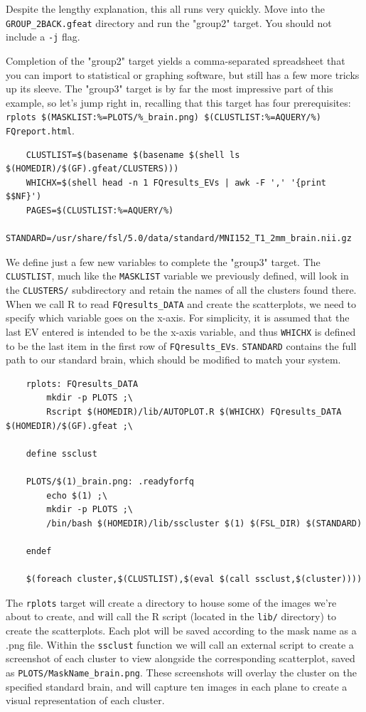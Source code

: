 Despite the lengthy explanation, this all runs very quickly. Move into the \texttt{GROUP_2BACK.gfeat} directory and run the "group2" target. You should not include a \texttt{-j} flag.

Completion of the "group2" target yields a comma-separated spreadsheet that you can import to statistical or graphing software, but \maken{} still has a few more tricks up its sleeve. The "group3" target is by far the most impressive part of this example, so let's jump right in, recalling that this target has four prerequisites: \texttt{rplots \$(MASKLIST:\%=PLOTS/\%_brain.png) \$(CLUSTLIST:\%=AQUERY/\%) FQreport.html}.

\begin{lstlisting}
	CLUSTLIST=$(basename $(basename $(shell ls $(HOMEDIR)/$(GF).gfeat/CLUSTERS)))
	WHICHX=$(shell head -n 1 FQresults_EVs | awk -F ',' '{print $$NF}')
	PAGES=$(CLUSTLIST:%=AQUERY/%)
	STANDARD=/usr/share/fsl/5.0/data/standard/MNI152_T1_2mm_brain.nii.gz
\end{lstlisting}

We define just a few new variables to complete the "group3" target. The \texttt{CLUSTLIST}, much like the \texttt{MASKLIST} variable we previously defined, will look in the \texttt{CLUSTERS/} subdirectory and retain the names of all the clusters found there. When we call R to read \texttt{FQresults_DATA} and create the scatterplots, we need to specify which variable goes on the x-axis. For simplicity, it is assumed that the last EV entered is intended to be the x-axis variable, and thus \texttt{WHICHX} is defined to be the last item in the first row of \texttt{FQresults_EVs}. \texttt{STANDARD} contains the full path to our standard brain, which should be modified to match your system.

\begin{lstlisting}
	rplots: FQresults_DATA
		mkdir -p PLOTS ;\
		Rscript $(HOMEDIR)/lib/AUTOPLOT.R $(WHICHX) FQresults_DATA $(HOMEDIR)/$(GF).gfeat ;\
		
	define ssclust
	
	PLOTS/$(1)_brain.png: .readyforfq
		echo $(1) ;\
		mkdir -p PLOTS ;\
		/bin/bash $(HOMEDIR)/lib/sscluster $(1) $(FSL_DIR) $(STANDARD)
			
	endef
	
	$(foreach cluster,$(CLUSTLIST),$(eval $(call ssclust,$(cluster))))
\end{lstlisting}

The \texttt{rplots} target will create a directory to house some of the images we're about to create, and will call the R script (located in the \texttt{lib/} directory) to create the scatterplots. Each plot will be saved according to the mask name as a .png file.  Within the \texttt{ssclust} function we will call an external script to create a screenshot of each cluster to view alongside the corresponding scatterplot, saved as \texttt{PLOTS/MaskName_brain.png}. These screenshots will overlay the cluster on the specified standard brain, and will capture ten images in each plane to create a visual representation of each cluster.

